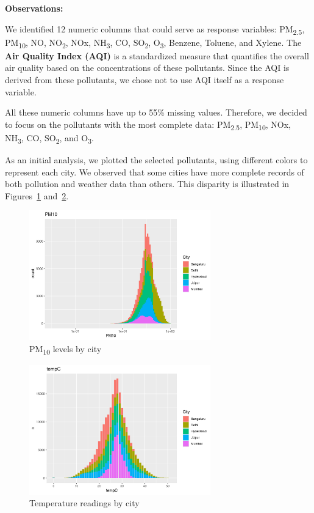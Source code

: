 \documentclass[12pt]{article}
\begin{document}
\textbf{Observations:}

We identified 12 numeric columns that could serve as response variables: PM\textsubscript{2.5}, PM\textsubscript{10}, NO, NO\textsubscript{2}, NOx, NH\textsubscript{3}, CO, SO\textsubscript{2}, O\textsubscript{3}, Benzene, Toluene, and Xylene. The \textbf{Air Quality Index (AQI)} is a standardized measure that quantifies the overall air quality based on the concentrations of these pollutants. Since the AQI is derived from these pollutants, we chose not to use AQI itself as a response variable.

All these numeric columns have up to 55\% missing values. Therefore, we decided to focus on the pollutants with the most complete data: PM\textsubscript{2.5}, PM\textsubscript{10}, NOx, NH\textsubscript{3}, CO, SO\textsubscript{2}, and O\textsubscript{3}.

As an initial analysis, we plotted the selected pollutants, using different colors to represent each city. We observed that some cities have more complete records of both pollution and weather data than others. This disparity is illustrated in Figures~\ref{fig:pm10_by_city} and~\ref{fig:temp_by_city}.

\begin{figure}[h]
    \centering
    \includegraphics[width=0.7\textwidth]{pm10-by-city.png}
    \caption{PM\textsubscript{10} levels by city}
    \label{fig:pm10_by_city}
\end{figure}

\begin{figure}[h]
    \centering
    \includegraphics[width=0.7\textwidth]{temp-by-city.png}
    \caption{Temperature readings by city}
    \label{fig:temp_by_city}
\end{figure}
\end{document}
